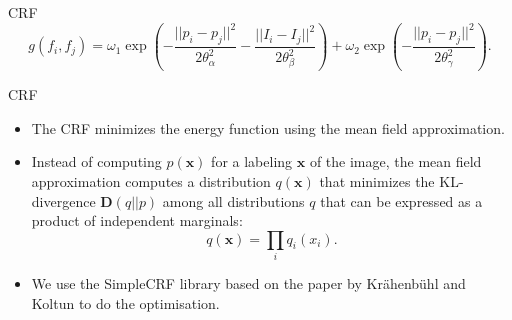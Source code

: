 \begin{frame}{CRF}
    \begin{equation}
        g(f_i, f_j) =
            \omega_1\exp\left(-\frac{||p_i - p_j||^2}{2\theta_{\alpha}^2}
                              -\frac{||I_i - I_j||^2}{2\theta_{\beta}^2}\right)
            + \omega_2\exp\left(-\frac{||p_i - p_j||^2}{2\theta_{\gamma}^2}\right).
    \end{equation}
\end{frame}

\begin{frame}{CRF}
    \begin{itemize}
        \item<1-> The CRF minimizes the energy function using the mean field approximation.
        \item<2-> Instead of computing $p(\mathbf{x})$ for a labeling
            $\mathbf{x}$ of the image, the mean field approximation computes a
            distribution $q(\mathbf{x})$ that minimizes the KL-divergence
            $\mathbf{D}(q||p)$ among all distributions $q$ that can be expressed
            as a product of independent marginals: \[
                q(\mathbf{x}) = \prod_{i} q_i(x_i).
            \] 
        \item<3-> We use the SimpleCRF library based on the paper by
            Kr\"{a}henb\"{u}hl and Koltun \cite{crf-inference} to do the
            optimisation.
    \end{itemize}
\end{frame}
